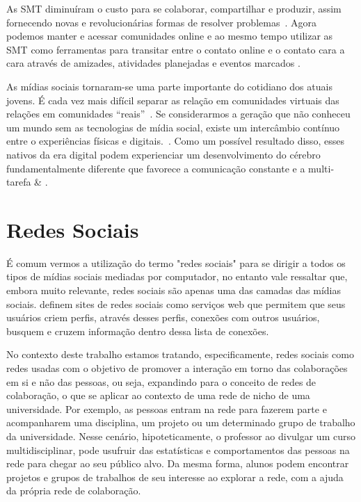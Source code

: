 As SMT diminuíram o custo para se colaborar, compartilhar e produzir,
assim fornecendo novas e revolucionárias formas de resolver problemas~\cite{shirky2010}.
%
Agora podemos manter e acessar comunidades online e ao mesmo tempo utilizar as SMT
como ferramentas para transitar entre o contato online e o contato cara a cara
através de amizades, atividades planejadas e eventos marcados \cite{shirky2010}.

As mídias sociais tornaram-se  uma parte importante do cotidiano dos atuais jovens.
É cada vez mais difícil separar as relação em comunidades virtuais das relações em
comunidades ``reais''~\cite{davis2012}.
%
Se considerarmos a geração que não conheceu um mundo sem as
tecnologias de mídia social, existe um intercâmbio contínuo entre o experiências
físicas e digitais.~\cite{davis2012}.
%
Como um possível resultado disso, esses nativos da era digital podem experienciar um
desenvolvimento do cérebro fundamentalmente diferente que favorece a comunicação
constante e a multi-tarefa \cite{prensky2001} \& \cite{vorgan2009}.

\section{Redes Sociais}

É comum vermos a utilização do termo "redes sociais" para se dirigir a todos os
tipos de mídias sociais mediadas por computador, no entanto vale ressaltar que,
embora muito relevante, redes sociais são apenas uma das camadas das mídias sociais.
%
 definem sites de redes sociais como serviços
web que permitem que seus usuários criem perfis, através desses perfis,
conexões com outros usuários, busquem e cruzem informação dentro dessa lista
de conexões.

No contexto deste trabalho estamos tratando, especificamente, redes sociais como redes 
usadas com o objetivo de promover a interação em torno das colaborações em si e
não das pessoas, ou seja, expandindo para o conceito de redes de colaboração, o que
se aplicar ao contexto de uma rede de nicho de uma universidade. 
%
Por exemplo, as pessoas entram na rede para fazerem parte e acompanharem uma disciplina, um projeto
ou um determinado grupo de trabalho da universidade.
%
Nesse cenário, hipoteticamente, o professor ao divulgar um curso multidisciplinar, pode usufruir das estatísticas e
comportamentos das pessoas na rede para chegar ao seu público alvo.
%
Da mesma forma, alunos podem encontrar projetos e grupos de trabalhos de seu interesse ao
explorar a rede, com a ajuda da própria rede de colaboração.

